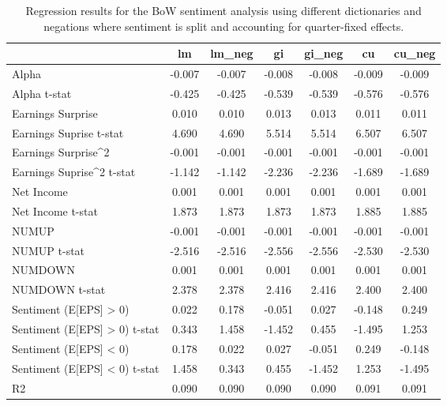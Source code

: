 \begin{table}
\caption{Regression results for the BoW sentiment analysis using different dictionaries and negations where sentiment is split and accounting for quarter-fixed effects.}
\label{tab:bow_regressions_split_quarter_fixed}
\begin{tabular}{lcccccc}
\toprule
 & lm & lm_neg & gi & gi_neg & cu & cu_neg \\
\midrule
Alpha & -0.007 & -0.007 & -0.008 & -0.008 & -0.009 & -0.009 \\
Alpha t-stat & -0.425 & -0.425 & -0.539 & -0.539 & -0.576 & -0.576 \\
Earnings Surprise & 0.010 & 0.010 & 0.013 & 0.013 & 0.011 & 0.011 \\
Earnings Suprise t-stat & 4.690 & 4.690 & 5.514 & 5.514 & 6.507 & 6.507 \\
Earnings Surprise^2 & -0.001 & -0.001 & -0.001 & -0.001 & -0.001 & -0.001 \\
Earnings Suprise^2 t-stat & -1.142 & -1.142 & -2.236 & -2.236 & -1.689 & -1.689 \\
Net Income & 0.001 & 0.001 & 0.001 & 0.001 & 0.001 & 0.001 \\
Net Income t-stat & 1.873 & 1.873 & 1.873 & 1.873 & 1.885 & 1.885 \\
NUMUP & -0.001 & -0.001 & -0.001 & -0.001 & -0.001 & -0.001 \\
NUMUP t-stat & -2.516 & -2.516 & -2.556 & -2.556 & -2.530 & -2.530 \\
NUMDOWN & 0.001 & 0.001 & 0.001 & 0.001 & 0.001 & 0.001 \\
NUMDOWN t-stat & 2.378 & 2.378 & 2.416 & 2.416 & 2.400 & 2.400 \\
Sentiment (E[EPS] > 0) & 0.022 & 0.178 & -0.051 & 0.027 & -0.148 & 0.249 \\
Sentiment (E[EPS] > 0) t-stat & 0.343 & 1.458 & -1.452 & 0.455 & -1.495 & 1.253 \\
Sentiment (E[EPS] < 0) & 0.178 & 0.022 & 0.027 & -0.051 & 0.249 & -0.148 \\
Sentiment (E[EPS] < 0) t-stat & 1.458 & 0.343 & 0.455 & -1.452 & 1.253 & -1.495 \\
R2 & 0.090 & 0.090 & 0.090 & 0.090 & 0.091 & 0.091 \\
\bottomrule
\end{tabular}
\end{table}
